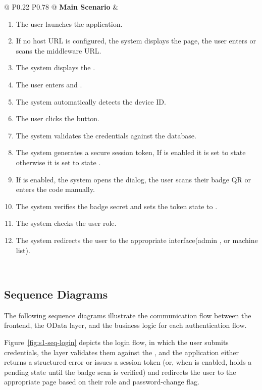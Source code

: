 \begin{longtable}{@{} P{0.22\linewidth} P{0.78\linewidth} @{}}
	\textbf{Main Scenario}  &                                                                      
	\begin{enumerate}[nosep, leftmargin=*]
	\item The user launches the application.
	\item If no host URL is configured, the system displays the  page, the user enters or scans the middleware URL.
 	\item The system displays the .
	\item The user enters  and .
	\item The system automatically detects the device ID.
	\item The user clicks the  button.
	\item The system validates the credentials against the  database.
	\item The system generates a secure session token, If  is enabled it is set to state  otherwise it is set to state .
	\item If  is enabled, the system opens the  dialog, the user scans their badge QR or enters the code manually.
	\item The system verifies the badge secret and sets the token state to .
	\item The system checks the user role.
	\item The system redirects the user to the appropriate interface(admin , or machine list).
	\end{enumerate} \\
	
	
\end{longtable}

\subsection{Sequence Diagrams}

The following sequence diagrams illustrate the communication flow between the
 frontend, the  OData layer, and
the  business logic for each authentication flow.
 
Figure~\ref{fig:s1-seq-login} depicts the login flow, in which the user submits
credentials, the  layer validates them against the
, and the application either returns a
structured error or issues a session token (or, when  is enabled,
holds a pending state until the badge scan is verified) and redirects the user to
the appropriate page based on their role and password-change flag.

